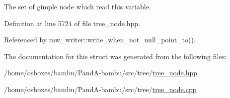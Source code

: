 The set of gimple node which read this variable. 



Definition at line 5724 of file tree\+\_\+node.\+hpp.



Referenced by raw\+\_\+writer\+::write\+\_\+when\+\_\+not\+\_\+null\+\_\+point\+\_\+to().



The documentation for this struct was generated from the following files\+:\begin{DoxyCompactItemize}
\item 
/home/osboxes/bambu/\+Pand\+A-\/bambu/src/tree/\hyperlink{tree__node_8hpp}{tree\+\_\+node.\+hpp}\item 
/home/osboxes/bambu/\+Pand\+A-\/bambu/src/tree/\hyperlink{tree__node_8cpp}{tree\+\_\+node.\+cpp}\end{DoxyCompactItemize}
